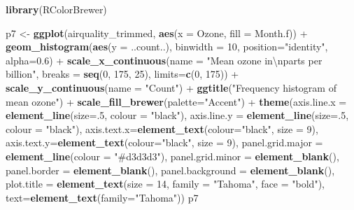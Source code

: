 \documentclass[]{article}
\newenvironment{Shaded}{\begin{snugshade}}{\end{snugshade}}
\newcommand{\KeywordTok}[1]{\textcolor[rgb]{0.13,0.29,0.53}{\textbf{{#1}}}}
\newcommand{\DataTypeTok}[1]{\textcolor[rgb]{0.13,0.29,0.53}{{#1}}}
\newcommand{\DecValTok}[1]{\textcolor[rgb]{0.00,0.00,0.81}{{#1}}}
\newcommand{\FloatTok}[1]{\textcolor[rgb]{0.00,0.00,0.81}{{#1}}}
\newcommand{\CharTok}[1]{\textcolor[rgb]{0.31,0.60,0.02}{{#1}}}
\newcommand{\StringTok}[1]{\textcolor[rgb]{0.31,0.60,0.02}{{#1}}}
\newcommand{\NormalTok}[1]{{#1}}
\begin{document}
\begin{Shaded}
\begin{Highlighting}[]
\KeywordTok{library}\NormalTok{(RColorBrewer)}

\NormalTok{p7 <-}\StringTok{ }\KeywordTok{ggplot}\NormalTok{(airquality_trimmed, }\KeywordTok{aes}\NormalTok{(}\DataTypeTok{x =} \NormalTok{Ozone, }\DataTypeTok{fill =} \NormalTok{Month.f)) +}\StringTok{ }
\StringTok{      }\KeywordTok{geom_histogram}\NormalTok{(}\KeywordTok{aes}\NormalTok{(}\DataTypeTok{y =} \NormalTok{..count..), }\DataTypeTok{binwidth =} \DecValTok{10}\NormalTok{,}
                     \DataTypeTok{position=}\StringTok{"identity"}\NormalTok{, }\DataTypeTok{alpha=}\FloatTok{0.6}\NormalTok{) +}
\StringTok{      }\KeywordTok{scale_x_continuous}\NormalTok{(}\DataTypeTok{name =} \StringTok{"Mean ozone in}\CharTok{\textbackslash{}n}\StringTok{parts per billion"}\NormalTok{,}
                         \DataTypeTok{breaks =} \KeywordTok{seq}\NormalTok{(}\DecValTok{0}\NormalTok{, }\DecValTok{175}\NormalTok{, }\DecValTok{25}\NormalTok{),}
                         \DataTypeTok{limits=}\KeywordTok{c}\NormalTok{(}\DecValTok{0}\NormalTok{, }\DecValTok{175}\NormalTok{)) +}
\StringTok{      }\KeywordTok{scale_y_continuous}\NormalTok{(}\DataTypeTok{name =} \StringTok{"Count"}\NormalTok{) +}
\StringTok{      }\KeywordTok{ggtitle}\NormalTok{(}\StringTok{"Frequency histogram of mean ozone"}\NormalTok{) +}
\StringTok{      }\KeywordTok{scale_fill_brewer}\NormalTok{(}\DataTypeTok{palette=}\StringTok{"Accent"}\NormalTok{) +}
\StringTok{      }\KeywordTok{theme}\NormalTok{(}\DataTypeTok{axis.line.x =} \KeywordTok{element_line}\NormalTok{(}\DataTypeTok{size=}\NormalTok{.}\DecValTok{5}\NormalTok{, }\DataTypeTok{colour =} \StringTok{"black"}\NormalTok{), }
            \DataTypeTok{axis.line.y =} \KeywordTok{element_line}\NormalTok{(}\DataTypeTok{size=}\NormalTok{.}\DecValTok{5}\NormalTok{, }\DataTypeTok{colour =} \StringTok{"black"}\NormalTok{),}
            \DataTypeTok{axis.text.x=}\KeywordTok{element_text}\NormalTok{(}\DataTypeTok{colour=}\StringTok{"black"}\NormalTok{, }\DataTypeTok{size =} \DecValTok{9}\NormalTok{), }
            \DataTypeTok{axis.text.y=}\KeywordTok{element_text}\NormalTok{(}\DataTypeTok{colour=}\StringTok{"black"}\NormalTok{, }\DataTypeTok{size =} \DecValTok{9}\NormalTok{),}
            \DataTypeTok{panel.grid.major =} \KeywordTok{element_line}\NormalTok{(}\DataTypeTok{colour =} \StringTok{"#d3d3d3"}\NormalTok{), }
            \DataTypeTok{panel.grid.minor =} \KeywordTok{element_blank}\NormalTok{(), }
            \DataTypeTok{panel.border =} \KeywordTok{element_blank}\NormalTok{(), }\DataTypeTok{panel.background =} \KeywordTok{element_blank}\NormalTok{(),}
            \DataTypeTok{plot.title =} \KeywordTok{element_text}\NormalTok{(}\DataTypeTok{size =} \DecValTok{14}\NormalTok{, }\DataTypeTok{family =} \StringTok{"Tahoma"}\NormalTok{, }\DataTypeTok{face =} \StringTok{"bold"}\NormalTok{),}
            \DataTypeTok{text=}\KeywordTok{element_text}\NormalTok{(}\DataTypeTok{family=}\StringTok{"Tahoma"}\NormalTok{))}
\NormalTok{p7}
\end{Highlighting}
\end{Shaded}
\end{document}
